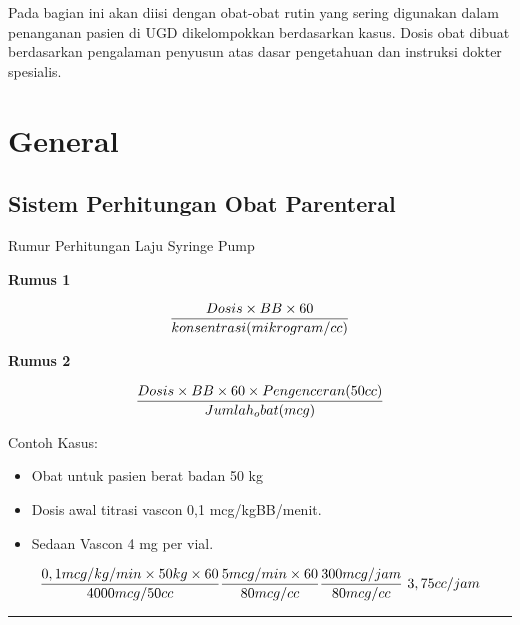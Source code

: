 \documentclass[
]{book}
\providecommand{\tightlist}{%
  \setlength{\itemsep}{0pt}\setlength{\parskip}{0pt}}
\begin{document}
Pada bagian ini akan diisi dengan obat-obat rutin yang sering digunakan dalam penanganan pasien di UGD dikelompokkan berdasarkan kasus. Dosis obat dibuat berdasarkan pengalaman penyusun atas dasar pengetahuan dan instruksi dokter spesialis.

\hypertarget{general-1}{%
\section{General}\label{general-1}}

\hypertarget{sistem-perhitungan-obat-parenteral}{%
\subsection{Sistem Perhitungan Obat Parenteral}\label{sistem-perhitungan-obat-parenteral}}

Rumur Perhitungan Laju Syringe Pump

\textbf{Rumus 1}

\begin{equation}
\\
\frac{Dosis \times BB \times 60}{konsentrasi (mikrogram/cc)}
\\
\end{equation}

\textbf{Rumus 2}

\begin{equation}
\\
\frac{Dosis \times BB \times 60 \times Pengenceran(50 cc)}{Jumlah_obat (mcg)}
\end{equation}

Contoh Kasus:

\begin{itemize}
\tightlist
\item
  Obat untuk pasien berat badan 50 kg
\item
  Dosis awal titrasi vascon 0,1 mcg/kgBB/menit.
\item
  Sedaan Vascon 4 mg per vial.
\end{itemize}

\begin{equation}
\frac{0,1 mcg/kg/min \times 50 kg \times 60}{4000 mcg/50cc}
\\
\frac{5 mcg/min \times 60}{80mcg/cc}
\\ 
\frac{300 mcg/jam}{80 mcg/cc}
\\ 
\ 3,75 cc/jam
\\
\end{equation}

\begin{center}\rule{0.5\linewidth}{0.5pt}\end{center}
\end{document}
